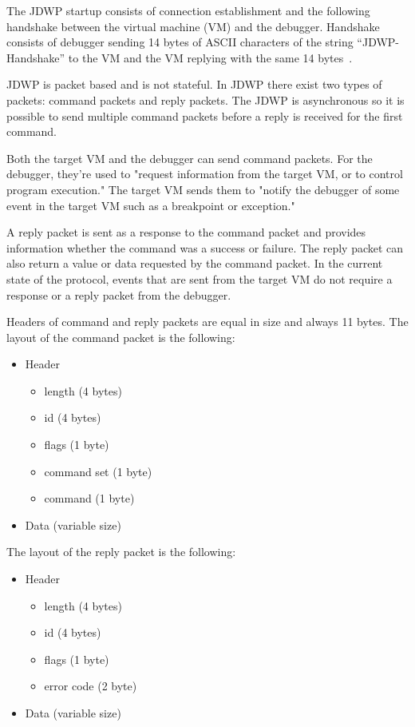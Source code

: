 \documentclass[..thesis.tex]{subfiles}
\begin{document}
The JDWP startup consists of connection establishment and the following handshake between the virtual machine (VM) and the debugger.
Handshake consists of debugger sending 14 bytes of ASCII characters of the string \enquote{JDWP-Handshake} to the VM and the VM replying with the same 14 bytes~\cite{oracle_jdwp_spec}.

JDWP is packet based and is not stateful. In JDWP there exist two types of packets: command packets and reply packets.
The JDWP is asynchronous so it is possible to send multiple command packets before a reply is received for the first command.

Both the target VM and the debugger can send command packets. For the debugger, they're used to "request information from the target VM, or to control program execution."
The target VM sends them to "notify the debugger of some event in the target VM such as a breakpoint or exception."\cite{oracle_jdwp_spec}

A reply packet is sent as a response to the command packet and provides information whether the command was a success or failure. The reply packet can also return a value or data requested by the command packet. In the current state of the protocol, events that are sent from the target VM do not require a response or a reply packet from the debugger.\cite{oracle_jdwp_spec}

Headers of command and reply packets are equal in size and always 11 bytes. The layout of the command packet is the following:
\begin{itemize}[nosep]
  \item Header
    \begin{itemize}[nosep]
      \item length (4 bytes)
      \item id (4 bytes)
      \item flags (1 byte)
      \item command set (1 byte)
      \item command (1 byte)
    \end{itemize}
  \item Data (variable size) 
\end{itemize}

The layout of the reply packet is the following:
\begin{itemize}[nosep]
  \item Header
    \begin{itemize}[nosep]
      \item length (4 bytes)
      \item id (4 bytes)
      \item flags (1 byte)
      \item error code (2 byte)
    \end{itemize}
  \item Data (variable size) 
\end{itemize}
\end{document}
